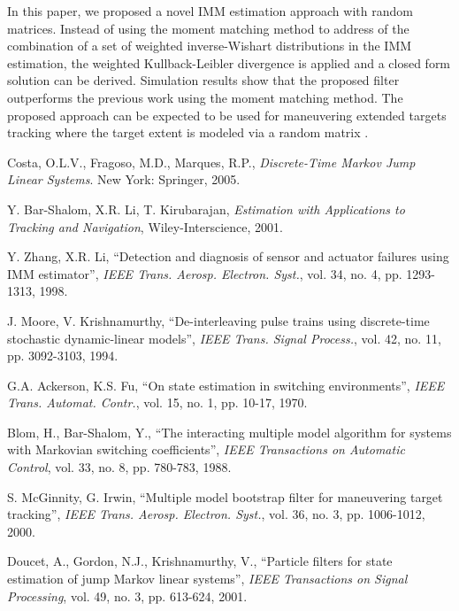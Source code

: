 \documentclass[12pt,draftcls,onecolumn]{IEEEtran}
\begin{document}
In this paper, we proposed a novel IMM estimation approach with
random matrices. Instead of using the moment matching method to
address of the combination of a set of weighted inverse-Wishart
distributions in the IMM estimation, the weighted Kullback-Leibler
divergence is applied and a closed form solution can be derived.
Simulation results show that the proposed filter outperforms the
previous work using the moment matching method. The proposed
approach can be expected to be used for maneuvering extended targets
tracking where the target extent is modeled via a random matrix
\cite{2008wkaes,2011etttsp,2014taekg,2012lan1,2012lan2,2014tsplan}.






\begin{thebibliography}{99}

Costa, O.L.V., Fragoso, M.D., Marques, R.P., \emph{Discrete-Time
Markov Jump Linear Systems}. New York: Springer, 2005.

Y. Bar-Shalom, X.R. Li, T. Kirubarajan, \emph{Estimation with
Applications to Tracking and Navigation}, Wiley-Interscience, 2001.


Y. Zhang, X.R. Li, ``Detection and diagnosis of sensor and actuator
failures using IMM estimator'',  \emph{IEEE Trans. Aerosp. Electron.
Syst.}, vol. 34, no. 4, pp. 1293-1313, 1998.


J. Moore, V. Krishnamurthy, ``De-interleaving pulse trains using
discrete-time stochastic dynamic-linear models'', \emph{IEEE Trans.
Signal Process.}, vol. 42, no. 11, pp. 3092-3103, 1994.


G.A. Ackerson, K.S. Fu, ``On state estimation in switching
environments'', \emph{IEEE Trans. Automat. Contr.}, vol. 15, no. 1,
pp. 10-17, 1970.

Blom, H., Bar-Shalom, Y., ``The interacting multiple model algorithm
for systems with Markovian switching coefficients'', \emph{IEEE
Transactions on Automatic Control}, vol. 33, no. 8, pp. 780-783,
1988.

S. McGinnity, G. Irwin, ``Multiple model bootstrap filter for
maneuvering target tracking'', \emph{IEEE Trans. Aerosp. Electron.
Syst.}, vol. 36, no. 3, pp. 1006-1012, 2000.


Doucet, A., Gordon, N.J., Krishnamurthy, V., ``Particle filters for
state estimation of jump Markov linear systems'', \emph{IEEE
Transactions on Signal Processing}, vol. 49, no. 3, pp. 613-624,
2001.


\end{thebibliography}
\end{document}
